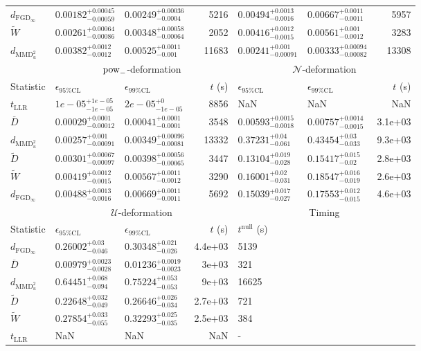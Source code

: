 \begin{tabular}{l|llr|llr}
	$d_{\mathrm{FGD}_{\infty}}$ & $0.00182_{-0.00059}^{+0.00045}$ & $0.00249_{-0.0004}^{+0.00036}$ & 5216 & $0.00494_{-0.0016}^{+0.0013}$ & $0.00667_{-0.0011}^{+0.0011}$ & 5957 \\
	$\widetilde{W}$ & $0.00261_{-0.00086}^{+0.00064}$ & $0.00348_{-0.00064}^{+0.00058}$ & 2052 & $0.00416_{-0.0015}^{+0.0012}$ & $0.00561_{-0.0012}^{+0.001}$ & 3283 \\
	$d_{\mathrm{MMD}^{2}_{u}}$ & $0.00382_{-0.0012}^{+0.0012}$ & $0.00525_{-0.001}^{+0.0011}$ & 11683 & $0.00241_{-0.00091}^{+0.001}$ & $0.00333_{-0.00082}^{+0.00094}$ & 13308 \\
	\toprule
	\multicolumn{1}{c}{} & \multicolumn{3}{c}{$\rm{pow}_{-}$-deformation} & \multicolumn{3}{c}{$\mathcal{N}$-deformation} \\
	Statistic & $\epsilon_{95\%\mathrm{CL}}$ & $\epsilon_{99\%\mathrm{CL}}$ & $t$ (s) & $\epsilon_{95\%\mathrm{CL}}$ & $\epsilon_{99\%\mathrm{CL}}$ & $t$ (s) \\
	\midrule
	$t_{\mathrm{LLR}}$ & $1e-05_{-1e-05}^{+1e-05}$ & $2e-05_{-1e-05}^{+0}$ & 8856 & NaN & NaN & NaN \\
	$\overline{D}$ & $0.00029_{-0.00012}^{+0.0001}$ & $0.00041_{-0.0001}^{+0.0001}$ & 3548 & $0.00593_{-0.0018}^{+0.0015}$ & $0.00757_{-0.0015}^{+0.0014}$ & 3.1e+03 \\
	$d_{\mathrm{MMD}^{2}_{u}}$ & $0.00257_{-0.00091}^{+0.001}$ & $0.00349_{-0.00081}^{+0.00096}$ & 13332 & $0.37231_{-0.061}^{+0.04}$ & $0.43454_{-0.033}^{+0.03}$ & 9.3e+03 \\
	$\widetilde{D}$ & $0.00301_{-0.00097}^{+0.00067}$ & $0.00398_{-0.00065}^{+0.00056}$ & 3447 & $0.13104_{-0.028}^{+0.019}$ & $0.15417_{-0.02}^{+0.015}$ & 2.8e+03 \\
	$\widetilde{W}$ & $0.00419_{-0.0015}^{+0.0012}$ & $0.00567_{-0.0012}^{+0.0011}$ & 3290 & $0.16001_{-0.031}^{+0.02}$ & $0.18547_{-0.019}^{+0.016}$ & 2.6e+03 \\
	$d_{\mathrm{FGD}_{\infty}}$ & $0.00488_{-0.0016}^{+0.0013}$ & $0.00669_{-0.0011}^{+0.0011}$ & 5692 & $0.15039_{-0.027}^{+0.017}$ & $0.17553_{-0.015}^{+0.012}$ & 4.6e+03 \\
	\toprule
	\multicolumn{1}{c}{} & \multicolumn{3}{c}{$\mathcal{U}$-deformation} & \multicolumn{3}{c}{Timing} \\
	Statistic & $\epsilon_{95\%\mathrm{CL}}$ & $\epsilon_{99\%\mathrm{CL}}$ & $t$ (s) & $t^{\mathrm{null}}$ (s) \\
	\midrule
	$d_{\mathrm{FGD}_{\infty}}$ & $0.26002_{-0.046}^{+0.03}$ & $0.30348_{-0.026}^{+0.021}$ & 4.4e+03 & 5139 \\
	$\overline{D}$ & $0.00979_{-0.0028}^{+0.0023}$ & $0.01236_{-0.0023}^{+0.0019}$ & 3e+03 & 321 \\
	$d_{\mathrm{MMD}^{2}_{u}}$ & $0.64451_{-0.094}^{+0.068}$ & $0.75224_{-0.053}^{+0.053}$ & 9e+03 & 16625 \\
	$\widetilde{D}$ & $0.22648_{-0.049}^{+0.032}$ & $0.26646_{-0.034}^{+0.026}$ & 2.7e+03 & 721 \\
	$\widetilde{W}$ & $0.27854_{-0.055}^{+0.033}$ & $0.32293_{-0.035}^{+0.025}$ & 2.5e+03 & 384 \\
	$t_{\mathrm{LLR}}$ & NaN & NaN & NaN & - \\
	\bottomrule
\end{tabular}